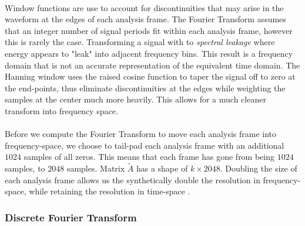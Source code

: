 \documentclass[12pt,letterpaper]{article}
\begin{document}
\paragraph*{}Window functions are use to account for discontinuities that may arise in the waveform at the edges of each analysis frame. The Fourier Transform assumes that an integer number of signal periods fit within each analysis frame, however this is rarely the case. Transforming a signal with to \textit{spectral leakage} where energy appears to "leak" into adjacent frequency bins. This result is a frequency domain that is not an accurate representation of the equivalent time domain. The Hanning window uses the raised cosine function to taper the signal off to zero at the end-points, thus eliminate discontinuities at the edges while weighting the samples at the center much more heavily. This allows for a much cleaner transform into frequency space.

\paragraph*{}Before we compute the Fourier Transform to move each analysis frame into frequency-space, we choose to tail-pad each analysis frame with an additional $1024$ samples of all zeros. This means that each frame has gone from being $1024$ samples, to $2048$ samples. Matrix $\widetilde{A}$ has a shape of $k \times 2048$. Doubling the size of each analysis frame allows us the synthetically double the resolution in frequency-space, while retaining the resolution in time-space \cite{Virtanen}. 


\subsubsection{Discrete Fourier Transform}
\label{subsubsec-DFT}
\end{document}
